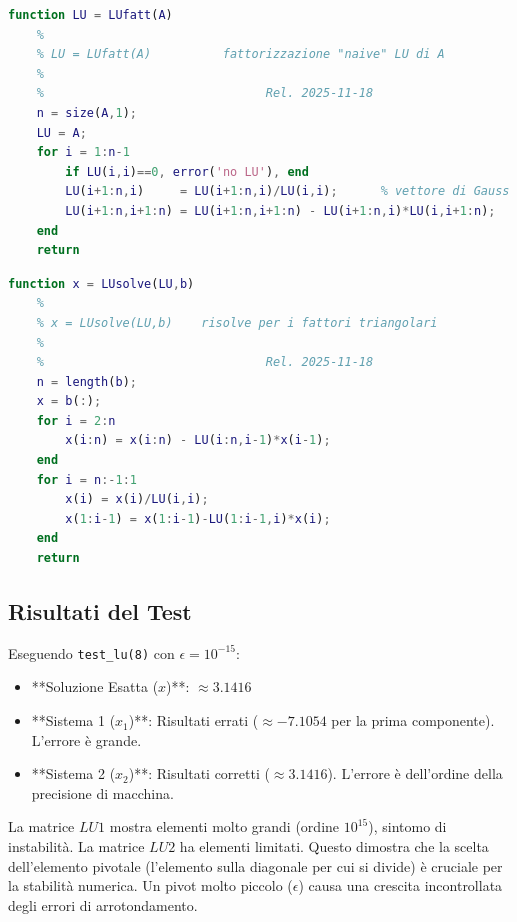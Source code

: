     \begin{lstlisting}[language=Matlab]
    function LU = LUfatt(A)
    %
    % LU = LUfatt(A)          fattorizzazione "naive" LU di A
    %
    %                               Rel. 2025-11-18
    n = size(A,1);
    LU = A;
    for i = 1:n-1
        if LU(i,i)==0, error('no LU'), end
        LU(i+1:n,i)     = LU(i+1:n,i)/LU(i,i);      % vettore di Gauss
        LU(i+1:n,i+1:n) = LU(i+1:n,i+1:n) - LU(i+1:n,i)*LU(i,i+1:n);
    end
    return
    \end{lstlisting}
    
    \begin{lstlisting}[language=Matlab]
    function x = LUsolve(LU,b)
    %
    % x = LUsolve(LU,b)    risolve per i fattori triangolari
    %
    %                               Rel. 2025-11-18
    n = length(b);
    x = b(:);
    for i = 2:n
        x(i:n) = x(i:n) - LU(i:n,i-1)*x(i-1);
    end
    for i = n:-1:1
        x(i) = x(i)/LU(i,i);
        x(1:i-1) = x(1:i-1)-LU(1:i-1,i)*x(i);
    end
    return
    \end{lstlisting}

\subsection{Risultati del Test}
Eseguendo \texttt{test\_lu(8)} con $\epsilon = 10^{-15}$:
\begin{itemize}
    \item **Soluzione Esatta ($x$)**: $\approx 3.1416$
    \item **Sistema 1 ($x_1$)**: Risultati errati ($\approx -7.1054$ per la prima componente). L'errore è grande.
    \item **Sistema 2 ($x_2$)**: Risultati corretti ($\approx 3.1416$). L'errore è dell'ordine della precisione di macchina.
\end{itemize}

La matrice $LU1$ mostra elementi molto grandi (ordine $10^{15}$), sintomo di instabilità. La matrice $LU2$ ha elementi limitati.
Questo dimostra che la scelta dell'elemento pivotale (l'elemento sulla diagonale per cui si divide) è cruciale per la stabilità numerica. Un pivot molto piccolo ($\epsilon$) causa una crescita incontrollata degli errori di arrotondamento.

